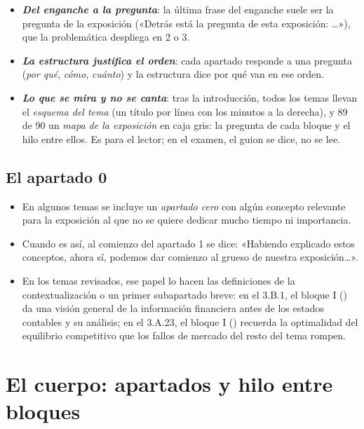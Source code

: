 \documentclass[11pt]{article}
\begin{document}
\begin{itemize}
\item \textbf{\emph{Del enganche a la pregunta}}: la última frase del enganche suele ser la pregunta de la exposición («Detrás está la pregunta de esta exposición: …»), que la problemática despliega en 2 o 3.
\item \textbf{\emph{La estructura justifica el orden}}: cada apartado responde a una pregunta (\emph{por qué}, \emph{cómo}, \emph{cuánto}) y la estructura dice por qué van en ese orden.
\item \textbf{\emph{Lo que se mira y no se canta}}: tras la introducción, todos los temas llevan el \emph{esquema del tema} (un título por línea con los minutos a la derecha), y 89 de 90 un \emph{mapa de la exposición} en caja gris: la pregunta de cada bloque y el hilo entre ellos. Es para el lector; en el examen, el guion se dice, no se lee.
\end{itemize}

\subsection{El apartado 0}\label{sec:apartado0}

\begin{itemize}
\item En algunos temas se incluye un \emph{apartado cero} con algún concepto relevante para la exposición al que no se quiere dedicar mucho tiempo ni importancia.
\item Cuando es así, al comienzo del apartado 1 se dice: «Habiendo explicado estos conceptos, ahora sí, podemos dar comienzo al grueso de nuestra exposición…».
\item En los temas revisados, ese papel lo hacen las definiciones de la contextualización o un primer subapartado breve: en el 3.B.1, el bloque I () da una visión general de la información financiera antes de los estados contables y su análisis; en el 3.A.23, el bloque I () recuerda la optimalidad del equilibrio competitivo que los fallos de mercado del resto del tema rompen.
\end{itemize}

\section{El cuerpo: apartados y hilo entre bloques}\label{sec:cuerpo}
\end{document}
